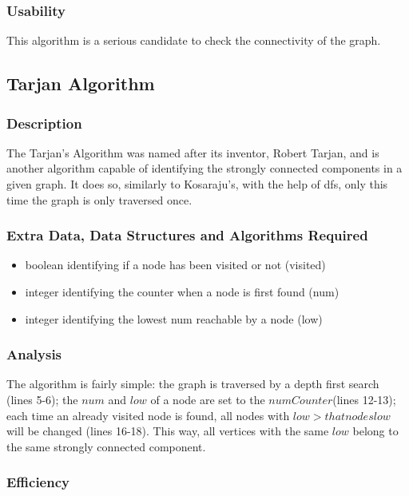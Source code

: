 \subsubsection{Usability}
This algorithm is a serious candidate to check the connectivity of the graph.


\subsection{Tarjan Algorithm}

\subsubsection{Description}
The Tarjan's Algorithm was named after its inventor, Robert Tarjan, and is another algorithm capable of identifying the strongly connected components in a given graph. It does so, similarly to Kosaraju's, with the help of dfs, only this time the graph is only traversed once.

\subsubsection{Extra Data, Data Structures and Algorithms Required}
\begin{itemize}
    \item boolean identifying if a node has been visited or not (visited)
    \item integer identifying the counter when a node is first found (num)
    \item integer identifying the lowest num reachable by a node (low)
\end{itemize}



\subsubsection{Analysis}
The algorithm is fairly simple: the graph is traversed by a depth first search (lines 5-6); the $num$ and $low$ of a node are set to the $numCounter$(lines 12-13); each time an already visited node is found, all nodes with $low > that nodes low$ will be changed (lines 16-18). This way, all vertices with the same $low$ belong to the same strongly connected component. 

\subsubsection{Efficiency}

